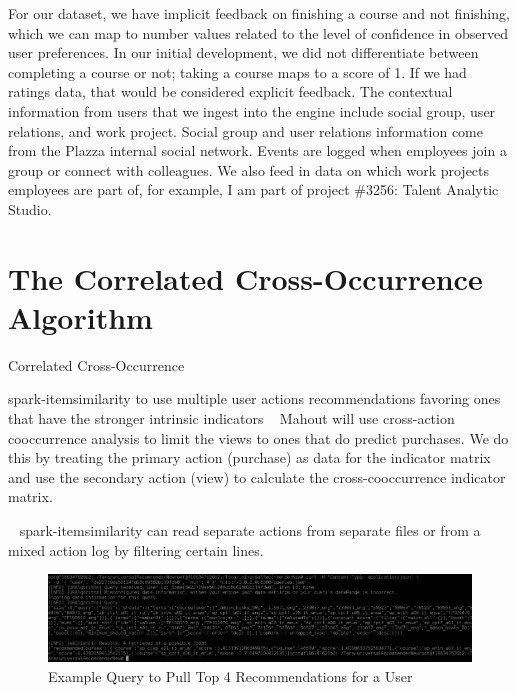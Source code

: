 \documentclass[12pt,journal]{IEEEtran}
\begin{document}
For our dataset, we have implicit feedback on finishing a course and not finishing, which we can map to number values related to the level of confidence in observed user preferences.  In our initial development, we did not differentiate between completing a course or not; taking a course maps to a score of 1.  If we had ratings data, that would be considered explicit feedback.  The contextual information from users that we ingest into the engine include social group, user relations, and work project.  Social group and user relations information come from the Plazza internal social network.  Events are logged when employees join a group or connect with colleagues.  We also feed in data on which work projects employees are part of, for example, I am part of project \#3256: Talent Analytic Studio.


\section{The Correlated Cross-Occurrence Algorithm}\cite{UniversalRecommender}

Correlated Cross-Occurrence \cite{Mahout}

\label{alg1}                           %
\begin{algorithmic}                    %
    \REQUIRE spark-itemsimilarity to use multiple user actions
\RETURN recommendations favoring ones that have the stronger intrinsic indicators
\vspace{1px}
   \STATE $\enspace$ Mahout will use cross-action cooccurrence analysis to limit the views to ones that do predict purchases. We do this by treating the primary action (purchase) as data for the indicator matrix and use the secondary action (view) to calculate the cross-cooccurrence indicator matrix.

    $\enspace$ spark-itemsimilarity can read separate actions from separate files or from a mixed action log by filtering certain lines.
   
\end{algorithmic}

\begin{figure}[htbp]
\begin{center}
\includegraphics[width=1\columnwidth]{examplequeryforuser}
\end{center}
\caption{Example Query to Pull Top 4 Recommendations for a User}
\label{fig:example query for user}
\end{figure}
\end{document}
